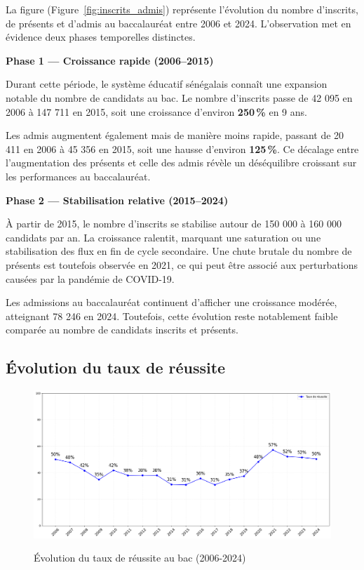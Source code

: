 La figure (Figure~\ref{fig:inscrits_admis}) représente l’évolution du nombre d’inscrits, de présents et d’admis au baccalauréat entre 2006 et 2024. 
L’observation met en évidence deux phases temporelles distinctes.

\textbf{Phase 1 — Croissance rapide (2006–2015)}  

Durant cette période, le système éducatif sénégalais connaît une expansion notable du nombre de candidats au bac. 
Le nombre d’inscrits passe de 42 095 en 2006 à 147 711 en 2015, soit une croissance d’environ \textbf{250\,\%} en 9 ans.

Les admis augmentent également mais de manière moins rapide, passant de 20 411 en 2006 à 45 356 en 2015, soit une hausse d’environ \textbf{125\,\%}. 
Ce décalage entre l’augmentation des présents et celle des admis révèle un déséquilibre croissant sur les performances au baccalauréat.

\textbf{Phase 2 — Stabilisation relative (2015–2024)}  

À partir de 2015, le nombre d’inscrits se stabilise autour de 150 000 à 160 000 candidats par an. 
La croissance ralentit, marquant une saturation ou une stabilisation des flux en fin de cycle secondaire. 
Une chute brutale du nombre de présents est toutefois observée en 2021, ce qui peut être associé aux perturbations causées par la pandémie de COVID-19.

Les admissions au baccalauréat continuent d'afficher une croissance modérée, atteignant 78 246 en 2024. Toutefois, cette évolution reste notablement faible comparée au nombre de candidats inscrits et présents.

\subsection{Évolution du taux de réussite}

\begin{figure}[ht]
\centering
\caption{Évolution du taux de réussite au bac (2006-2024)}
\includegraphics[width=1\textwidth]{figure/taux_bac.png}
\label{fig:taux_reussite}
\end{figure}

